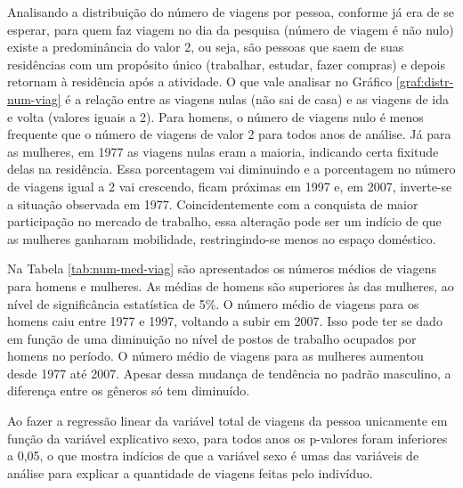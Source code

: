 \clearpage
Analisando a distribuição do número de viagens por pessoa, conforme já era de se esperar, para quem faz viagem no dia da pesquisa (número de viagem é não nulo) existe a predominância do valor 2, ou seja, são pessoas que saem de suas residências com um propósito único (trabalhar, estudar, fazer compras) e depois retornam à residência após a atividade. O que vale analisar no Gráfico \ref{graf:distr-num-viag} é a relação entre as viagens nulas (não sai de casa) e as viagens de ida e volta (valores iguais a 2). Para homens, o número de viagens nulo é menos frequente que o número de viagens de valor 2 para todos anos de análise. Já para as mulheres, em 1977 as viagens nulas eram a maioria, indicando certa fixitude delas na residência. Essa porcentagem vai diminuindo e a porcentagem no número de viagens igual a 2 vai crescendo, ficam próximas em 1997 e, em 2007, inverte-se a situação observada em 1977. Coincidentemente com a conquista de maior participação no mercado de trabalho, essa alteração pode ser um indício de que as mulheres ganharam mobilidade, restringindo-se menos ao espaço doméstico.

Na Tabela \ref{tab:num-med-viag} são apresentados os números médios de viagens para homens e mulheres. As médias de homens são superiores às das mulheres, ao nível de significância estatística de 5\%. O número médio de viagens para os homens caiu entre 1977 e 1997, voltando a subir em 2007. Isso pode ter se dado em função de uma diminuição no nível de postos de trabalho ocupados por homens no período. O número médio de viagens para as mulheres aumentou desde 1977 até 2007. Apesar dessa mudança de tendência no padrão masculino, a diferença entre os gêneros só tem diminuído.

Ao fazer a regressão linear da variável total de viagens da pessoa unicamente em função da variável explicativo sexo, para todos anos os p-valores foram inferiores a 0,05, o que mostra indícios de que a variável sexo é umas das variáveis de análise para explicar a quantidade de viagens feitas pelo indivíduo.


